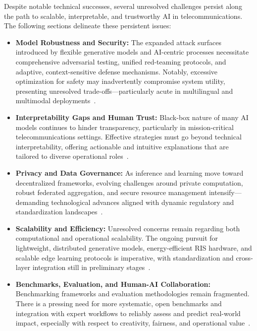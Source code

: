\documentclass[sigconf]{acmart}
\begin{document}
Despite notable technical successes, several unresolved challenges persist along the path to scalable, interpretable, and trustworthy AI in telecommunications. The following sections delineate these persistent issues:

\begin{itemize}
    \item \textbf{Model Robustness and Security:} The expanded attack surfaces introduced by flexible generative models and AI-centric processes necessitate comprehensive adversarial testing, unified red-teaming protocols, and adaptive, context-sensitive defense mechanisms. Notably, excessive optimization for safety may inadvertently compromise system utility, presenting unresolved trade-offs—particularly acute in multilingual and multimodal deployments~\cite{ref7, ref8, ref9, ref10, ref11, ref12}.
    \item \textbf{Interpretability Gaps and Human Trust:} Black-box nature of many AI models continues to hinder transparency, particularly in mission-critical telecommunications settings. Effective strategies must go beyond technical interpretability, offering actionable and intuitive explanations that are tailored to diverse operational roles~\cite{ref43, ref44, ref45, ref46, ref47, ref48, ref49}.
    \item \textbf{Privacy and Data Governance:} As inference and learning move toward decentralized frameworks, evolving challenges around private computation, robust federated aggregation, and secure resource management intensify—demanding technological advances aligned with dynamic regulatory and standardization landscapes~\cite{ref24, ref25, ref26, ref27, ref38, ref39, ref40}.
    \item \textbf{Scalability and Efficiency:} Unresolved concerns remain regarding both computational and operational scalability. The ongoing pursuit for lightweight, distributed generative models, energy-efficient RIS hardware, and scalable edge learning protocols is imperative, with standardization and cross-layer integration still in preliminary stages~\cite{ref28, ref31, ref32, ref33, ref34, ref35, ref36}.
    \item \textbf{Benchmarks, Evaluation, and Human-AI Collaboration:} Benchmarking frameworks and evaluation methodologies remain fragmented. There is a pressing need for more systematic, open benchmarks and integration with expert workflows to reliably assess and predict real-world impact, especially with respect to creativity, fairness, and operational value~\cite{ref6, ref13, ref19}.
\end{itemize}
\end{document}
